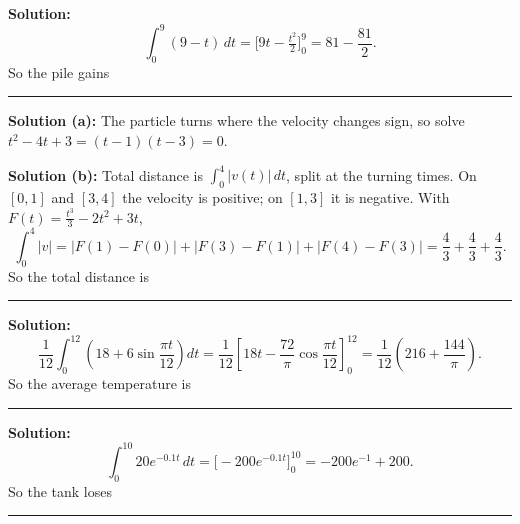 \documentclass[12pt]{article}
\begin{document}
\textbf{Solution:} \[ \int_0^9 (9 - t)\,dt = \Big[9t - \tfrac{t^2}{2}\Big]_0^9 = 81 - \frac{81}{2}. \]
So the pile gains 

\vspace{0.2cm}\noindent\rule{\linewidth}{0.2pt}\vspace{0.2cm}


\textbf{Solution (a):} The particle turns where the velocity changes sign, so solve $t^2 - 4t + 3 = (t-1)(t-3) = 0$. 

\textbf{Solution (b):} Total distance is $\displaystyle\int_0^4 |v(t)|\,dt$, split at the turning times. On $[0,1]$ and $[3,4]$ the velocity is positive; on $[1,3]$ it is negative. With $F(t) = \tfrac{t^3}{3} - 2t^2 + 3t$,
\[ \int_0^4 |v| = \big|F(1)-F(0)\big| + \big|F(3)-F(1)\big| + \big|F(4)-F(3)\big| = \frac{4}{3} + \frac{4}{3} + \frac{4}{3}. \]
So the total distance is 

\vspace{0.2cm}\noindent\rule{\linewidth}{0.2pt}\vspace{0.2cm}


\textbf{Solution:} \[ \frac{1}{12}\int_0^{12}\left(18 + 6\sin\frac{\pi t}{12}\right)dt = \frac{1}{12}\left[18t - \frac{72}{\pi}\cos\frac{\pi t}{12}\right]_0^{12} = \frac{1}{12}\left(216 + \frac{144}{\pi}\right). \]
So the average temperature is 

\vspace{0.2cm}\noindent\rule{\linewidth}{0.2pt}\vspace{0.2cm}


\textbf{Solution:} \[ \int_0^{10} 20e^{-0.1t}\,dt = \Big[-200e^{-0.1t}\Big]_0^{10} = -200e^{-1} + 200. \]
So the tank loses 

\vspace{0.2cm}\noindent\rule{\linewidth}{0.2pt}\vspace{0.2cm}

\end{document}

